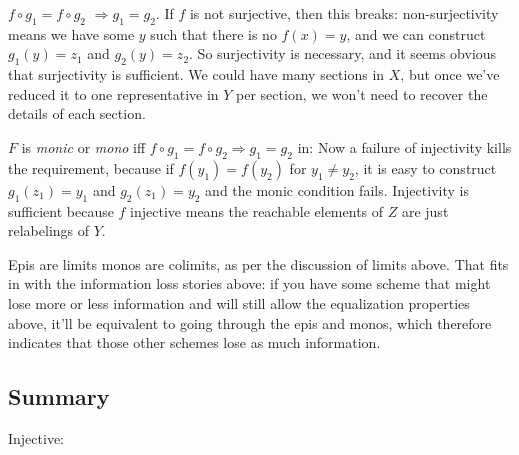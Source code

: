 \documentclass[11pt]{article}
\begin{document}

$f\circ g_1 = f\circ g_2$ $\Rightarrow g_1 = g_2$. If $f$ is not surjective, then
this breaks: non-surjectivity means we have some $y$ such that there is no $f(x)=y$,
and we can construct $g_1(y)=z_1$ and $g_2(y)=z_2$. So surjectivity is necessary, and
it seems obvious that surjectivity is sufficient. We could have many sections in $X$, but
once we've reduced it to one representative in $Y$ per section, we won't need to recover
the details of each section.

$F$ is {\em monic} or {\em mono} iff $f \circ g_1 = f \circ g_2 \Rightarrow g_1 = g_2$ in:
Now a failure of injectivity kills the requirement, because if $f(y_1)=f(y_2)$ for
$y_1\neq y_2$, it is easy to construct $g_1(z_1)=y_1$ and $g_2(z_1)=y_2$ and the monic
condition fails. Injectivity is sufficient because $f$ injective means the reachable
elements of $Z$ are just relabelings of $Y$.

Epis are limits monos are colimits, as per the discussion of limits above. That fits in
with the information loss stories above: if you have some scheme that might lose more or
less information and will still allow the equalization properties above, it'll be
equivalent to going through the epis and monos, which therefore indicates that those other
schemes lose as much information.

\subsection{Summary}

Injective:
\end{document}

